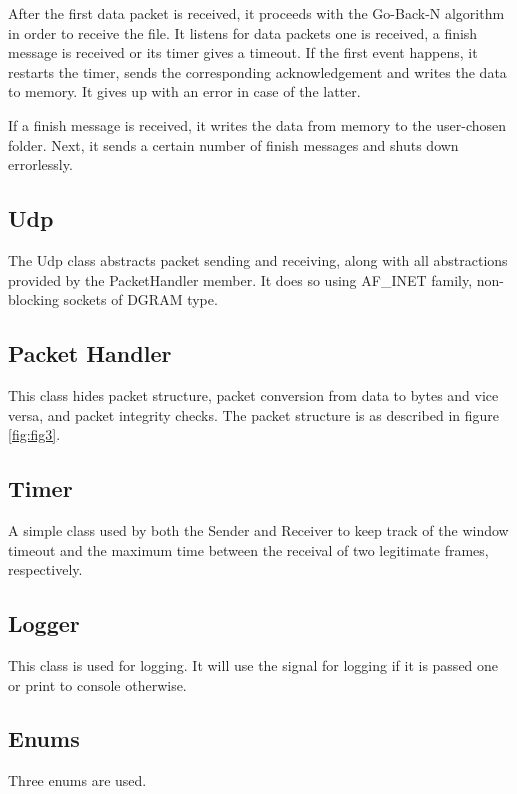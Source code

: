\documentclass[12pt]{article}
\begin{document}
After the first data packet is received, it proceeds with the Go-Back-N algorithm in order to receive the file. It listens for data packets one is received, a finish message is received or its timer gives a timeout. If the first event happens, it restarts the timer, sends the corresponding acknowledgement and writes the data to memory. It gives up with an error in case of the latter.

If a finish message is received, it writes the data from memory to the user-chosen folder. Next, it sends a certain number of finish messages and shuts down errorlessly.

\subsection{Udp}

The Udp class abstracts packet sending and receiving, along with all abstractions provided by the PacketHandler member. It does so using AF_INET family, non-blocking sockets of DGRAM type.

\subsection{Packet Handler}

This class hides packet structure, packet conversion from data to bytes and vice versa, and packet integrity checks. The packet structure is as described in figure  \ref{fig:fig3}.

\subsection{Timer}

A simple class used by both the Sender and Receiver to keep track of the window timeout and the maximum time between the receival of two legitimate frames, respectively.

\subsection{Logger}

This class is used for logging. It will use the signal for logging if it is passed one or print to console otherwise.

\subsection{Enums}

Three enums are used.
\end{document}
